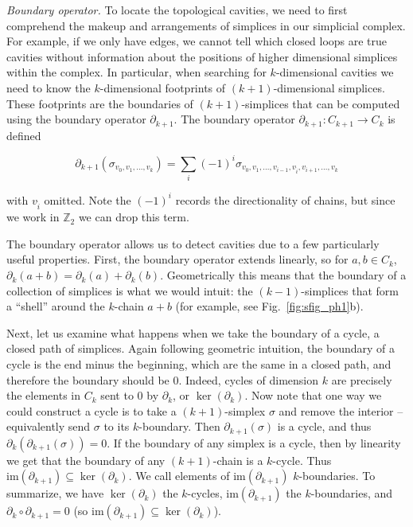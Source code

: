 \documentclass{article}
\begin{document}
\noindent\emph{Boundary operator.} To locate the topological cavities, we need to first comprehend the makeup and arrangements of simplices in our simplicial complex. For example, if we only have edges, we cannot tell which closed loops are true cavities without information about the positions of higher dimensional simplices within the complex. In particular, when searching for $k$-dimensional cavities we need to know the $k$-dimensional footprints of $(k+1)$-dimensional simplices. These footprints are the boundaries of $(k+1)$-simplices that can be computed using the boundary operator $\partial_{k+1}$. The boundary operator $\partial_{k+1}: C_{k+1} \rightarrow C_k$ is defined

$$\partial_{k+1}(\sigma_{v_0, v_1, \dots, v_k}) = \sum_i (-1)^i\sigma_{v_0, v_1, \dots, v_{i-1}, v_{\hat{i}}, v_{i+1}, \dots, v_k}$$

with $v_{\hat{i}}$ omitted. Note the $(-1)^i$ records the directionality of chains, but since we work in $\mathbb{Z}_2$ we can drop this term.

The boundary operator allows us to detect cavities due to a few particularly useful properties. First, the boundary operator extends linearly, so for $a,b \in C_k$, $\partial_k(a+b) = \partial_k(a) + \partial_k(b)$. Geometrically this means that the boundary of a collection of simplices is what we would intuit: the $(k-1)$-simplices that form a ``shell'' around the $k$-chain $a+b$ (for example, see Fig.~\ref{fig:sfig_ph1}b).

Next, let us examine what happens when we take the boundary of a cycle, a closed path of simplices. Again following geometric intuition, the boundary of a cycle is the end minus the beginning, which are the same in a closed path, and therefore the boundary should be $0$. Indeed, cycles of dimension $k$ are precisely the elements in $C_k$ sent to $0$ by $\partial_k$, or $\ker(\partial_k)$. Now note that one way we could construct a cycle is to take a $(k+1)$-simplex $\sigma$ and remove the interior -- equivalently send $\sigma$ to its $k$-boundary. Then $\partial_{k+1}(\sigma)$ is a cycle, and thus $\partial_k(\partial_{k+1}(\sigma)) = 0$. If the boundary of any simplex is a cycle, then by linearity we get that the boundary of any $(k+1)$-chain is a $k$-cycle. Thus $\text{im}(\partial_{k+1}) \subseteq \ker(\partial_k)$. We call elements of $\text{im}(\partial_{k+1})$ $k$-boundaries. To summarize, we have $\ker(\partial_k)$ the $k$-cycles, $\text{im}(\partial_{k+1})$ the $k$-boundaries, and $\partial_k \circ \partial_{k+1} = 0$ (so $\text{im}(\partial_{k+1}) \subseteq \ker(\partial_k)$). \\
\end{document}
